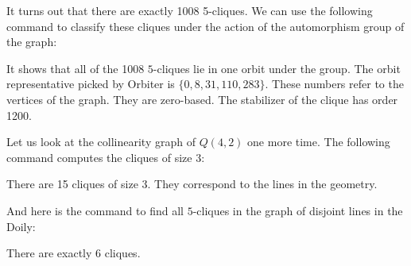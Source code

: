 
It turns out that there are exactly 1008 5-cliques.
We can use the following command to classify these cliques 
under the action of the automorphism group of the graph:


It shows that all of the 1008 $5$-cliques lie in one orbit under the group. 
The orbit representative picked by Orbiter is $\{0,8,31,110,283\}.$ 
These numbers refer to the vertices of the graph. They are zero-based.
The stabilizer of the clique has order 1200.


\bigskip


Let us look at the collinearity graph of $Q(4,2)$ one more time. 
The following command computes the 
cliques of size 3:


There are 15 cliques of size 3. They correspond to the lines in the geometry.

\bigskip




And here is the command to find all $5$-cliques in the graph of disjoint lines in the Doily:


There are exactly $6$ cliques. 





\bigskip

